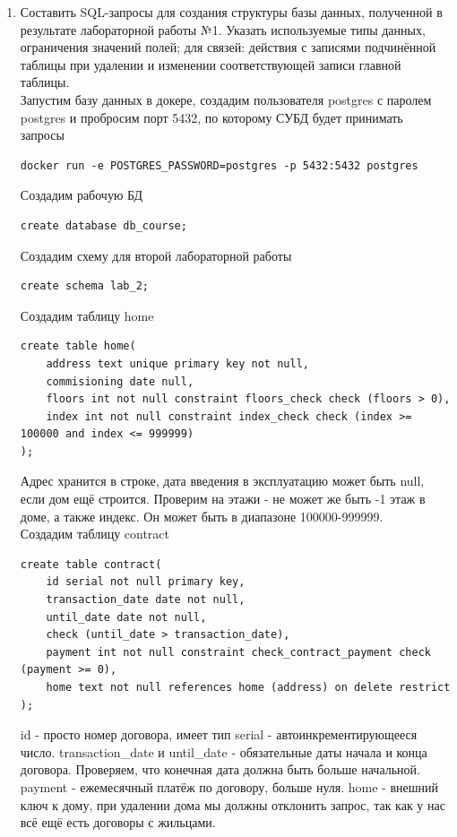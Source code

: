 \documentclass[a4paper,14pt]{extarticle}
\begin{document}
\begin{enumerate}[1.]
    \item Составить SQL-запросы для создания структуры базы данных, полученной
     в результате лабораторной работы №1. Указать используемые типы данных, 
     ограничения значений полей; для связей: действия с записями подчинённой таблицы 
     при удалении и изменении соответствующей записи главной таблицы. \\
          
    Запустим базу данных в докере, создадим пользователя 
    postgres с паролем postgres и пробросим порт 5432, по которому СУБД
    будет принимать запросы
    \begin{verbatim}
docker run -e POSTGRES_PASSWORD=postgres -p 5432:5432 postgres
    \end{verbatim}
    Создадим рабочую БД
\begin{verbatim}
create database db_course;
\end{verbatim}
Создадим схему для второй лабораторной работы
\begin{verbatim}
create schema lab_2;
\end{verbatim}
Создадим таблицу home
\begin{verbatim}
create table home(
    address text unique primary key not null,
    commisioning date null,
    floors int not null constraint floors_check check (floors > 0),
    index int not null constraint index_check check (index >= 100000 and index <= 999999)
);
\end{verbatim}
Адрес хранится в строке, дата введения в эксплуатацию может быть null, если дом ещё строится.
Проверим на этажи - не может же быть -1 этаж в доме, а также индекс. Он может быть в диапазоне 100000-999999.\\
Создадим таблицу contract
\begin{verbatim}
create table contract(
    id serial not null primary key,
    transaction_date date not null,
    until_date date not null,
    check (until_date > transaction_date),
    payment int not null constraint check_contract_payment check (payment >= 0),
    home text not null references home (address) on delete restrict
);
\end{verbatim}

id - просто номер договора, имеет тип serial - автоинкрементирующееся число.
transaction\_date и until\_date - обязательные даты начала и конца договора.
Проверяем, что конечная дата должна быть больше начальной.
payment - ежемесячный платёж по договору, больше нуля.
home - внешний ключ к дому, при удалении дома мы должны отклонить запрос, так как
у нас всё ещё есть договоры с жильцами.\\


\end{enumerate}
\end{document}
